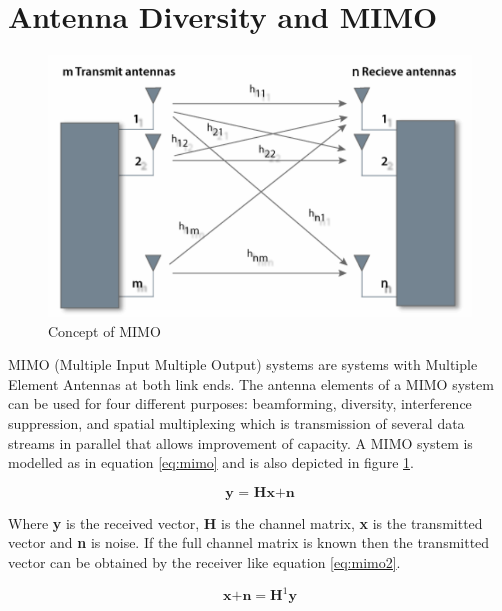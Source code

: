 \section{Antenna Diversity and MIMO}

\begin{figure}[H]
\centering 
\includegraphics[scale = 0.4]{figures/ch1/mimo.png}
\caption{Concept of MIMO \citep{silvus2019}}
\label{fig:mimo}
\end{figure}

MIMO (Multiple Input Multiple Output) systems are systems with Multiple Element Antennas at both link ends. The antenna elements of a MIMO system can be used for four different purposes: beamforming, diversity, interference suppression, and spatial multiplexing which is transmission of several data streams in parallel that allows improvement of capacity.\citep{molisch2011} A MIMO system is modelled as in equation \ref{eq:mimo} and is also depicted in figure \ref{fig:mimo}.

\begin{equation}\label{eq:mimo}
\textbf{y = Hx+n}
\end{equation}  

Where \textbf{y} is the received vector, \textbf{H} is the channel matrix, \textbf{x} is the transmitted vector and \textbf{n} is noise. If the full channel matrix is known then the transmitted vector can be obtained by the receiver like equation \ref{eq:mimo2}.  

\begin{equation}\label{eq:mimo2}
\textbf{x+n} = \textbf{H}^{1} \textbf{y}
\end{equation}  

